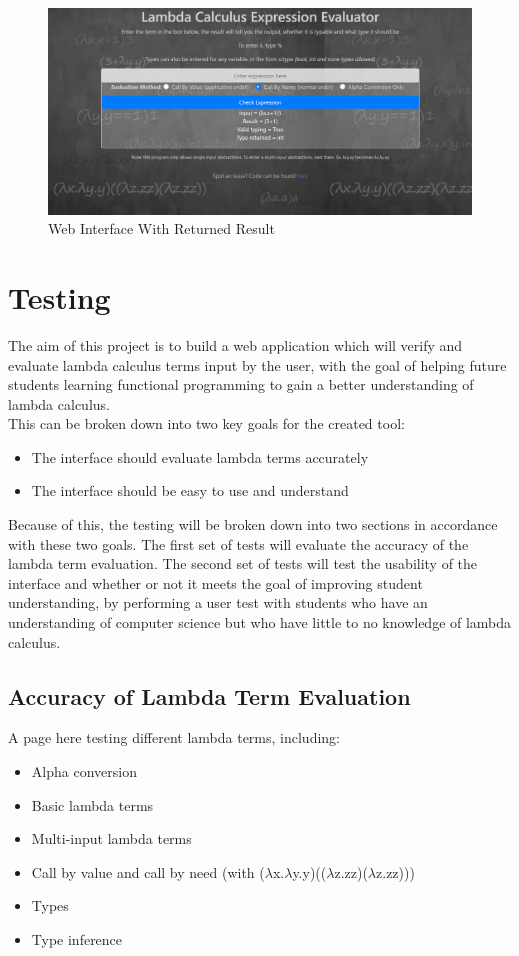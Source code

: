 \documentclass[a4paper,12pt]{report}
\begin{document}
\begin{figure}[p]
	\centering
	\includegraphics[scale=0.4]{images/web_interface_input}
	\caption{Web Interface With Returned Result}
	\label{web_interface_input}
\end{figure}

\chapter{Testing}
The aim of this project is to build a web application which will verify and evaluate lambda calculus terms input by the user, with the goal of helping future students learning functional programming to gain a better understanding of lambda calculus.\\

This can be broken down into two key goals for the created tool:
\begin{itemize}
	\item The interface should evaluate lambda terms accurately
	\item The interface should be easy to use and understand
\end{itemize}

Because of this, the testing will be broken down into two sections in accordance with these two goals. The first set of tests will evaluate the accuracy of the lambda term evaluation. The second set of tests will test the usability of the interface and whether or not it meets the goal of improving student understanding, by performing a user test with students who have an understanding of computer science but who have little to no knowledge of lambda calculus.

\section{Accuracy of Lambda Term Evaluation}
A page here testing different lambda terms, including:
\begin{itemize}
	\item Alpha conversion
	\item Basic lambda terms
	\item Multi-input lambda terms
	\item Call by value and call by need (with ($\lambda$x.$\lambda$y.y)(($\lambda$z.zz)($\lambda$z.zz)))
	\item Types
	\item Type inference
\end{itemize}
\newpage
\end{document}
